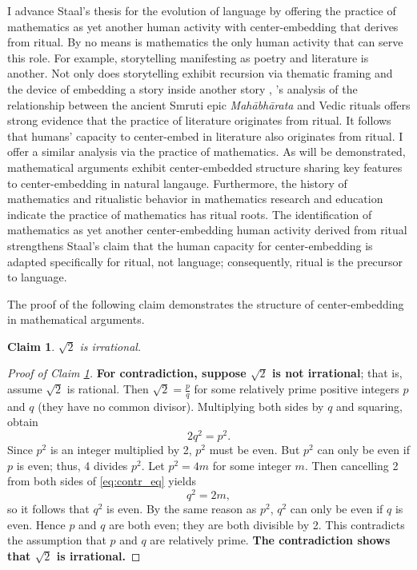 \documentclass[12pt, letterpaper]{article}
\newtheorem{claim}{Claim}
\begin{document}
I advance Staal's thesis for the evolution of language by offering the practice of mathematics as yet another human activity with center-embedding that derives from ritual.  
By no means is mathematics the only human activity that can serve this role. 
For example, storytelling manifesting as poetry and literature is another. 
Not only does storytelling exhibit recursion via thematic framing and the device of embedding a story inside another story \parencite{minkowski1989janamejayas, niles1979ring},
\cite{minkowski1989janamejayas}'s analysis of the relationship between the ancient Smruti epic \textit{Mah\={a}bh\={a}rata} and Vedic rituals offers strong evidence that the practice of literature originates from ritual. 
It follows that humans' capacity to center-embed in literature also originates from ritual.  
I offer a similar analysis via the practice of mathematics. 
As will be demonstrated, mathematical arguments exhibit center-embedded structure sharing key features to center-embedding in natural langauge. 
Furthermore, the history of mathematics and ritualistic behavior in mathematics research and education indicate the practice of mathematics has ritual roots. 
The identification of mathematics as yet another center-embedding human activity derived from ritual strengthens Staal's claim that the human capacity for center-embedding is adapted specifically for ritual, not language; 
consequently, ritual is the precursor to language. 

\vspace{1.5em} 
The proof of the following claim demonstrates the structure of center-embedding in mathematical arguments. 
\begin{claim} \label{thm:rt2_irrat}
  $\sqrt{2}$ is irrational. 
\end{claim}
\begin{proof}[Proof of Claim \ref{thm:rt2_irrat}]
  \textbf{For contradiction, suppose $\sqrt{2}$ is not irrational}; 
  that is, assume $\sqrt{2}$ is rational.
  Then $\sqrt{2} = \frac{p}{q}$ for some relatively prime positive integers $p$ and $q$ (they have no common divisor). 
  Multiplying both sides by $q$ and squaring, obtain 
  \begin{equation} \label{eq:contr_eq}
    2q^2 = p^2.
  \end{equation}
  Since $p^2$ is an integer multiplied by 2, $p^2$ must be even. 
  But $p^2$ can only be even if $p$ is even; 
  thus, 4 divides $p^2$. 
  Let $p^2 = 4m$ for some integer $m$. 
  Then cancelling 2 from both sides of \eqref{eq:contr_eq} yields 
  $$q^2 = 2m,$$
  so it follows that $q^2$ is even.
  By the same reason as $p^2$, $q^2$ can only be even if $q$ is even. 
  Hence $p$ and $q$ are both even; 
  they are both divisible by 2. 
  This contradicts the assumption that $p$ and $q$ are relatively prime. 
  \textbf{The contradiction shows that $\sqrt{2}$ is irrational.} 
\end{proof}
\end{document}
